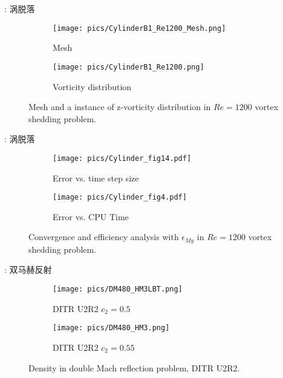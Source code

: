 \documentclass[aspectratio=169,serif]{beamer} %
\begin{document}
\begin{frame}{\secname: 涡脱落}
  \scriptsize
  \begin{figure}[htbp]
    \centering
    \begin{subfigure}{0.4\textwidth}
      \texttt{[image: pics/CylinderB1\_Re1200\_Mesh.png]}
      \caption[]{Mesh}
      \label{sfig:CylinderRe1200Demo_Mesh}
    \end{subfigure}
    \begin{subfigure}{0.4\textwidth}
      \texttt{[image: pics/CylinderB1\_Re1200.png]}
      \caption[]{Vorticity distribution}
      \label{sfig:CylinderRe1200Demo_Vort}
    \end{subfigure}
    \caption[]{Mesh and a instance of z-vorticity distribution
      in $Re=1200$ vortex shedding problem.}
    \label{fig:CylinderRe1200Demo}
  \end{figure}
\end{frame}



\begin{frame}{\secname: 涡脱落}
  \scriptsize
  \begin{figure}[htbp]
    \centering
    \begin{subfigure}{0.5\textwidth}
      \texttt{[image: pics/Cylinder\_fig14.pdf]}
      \caption[]{Error vs. time step size}
      \label{sfig:CylinderRe1200_My_C}
    \end{subfigure}\hfill
    \begin{subfigure}{0.5\textwidth}
      \texttt{[image: pics/Cylinder\_fig4.pdf]}
      \caption[]{Error vs. CPU Time}
      \label{sfig:CylinderRe1200_My_E}
    \end{subfigure}
    \caption[]{Convergence and efficiency analysis with $\epsilon_{My}$ in $Re=1200$ 
    vortex shedding problem.}
    \label{fig:CylinderRe1200_My}
  \end{figure}
\end{frame}

\begin{frame}{\secname: 双马赫反射}
  \scriptsize
  \begin{figure}[htbp]
    \centering
    \begin{subfigure}{0.5\textwidth}
      \texttt{[image: pics/DM480\_HM3LBT.png]}
      \caption[]{DITR U2R2 $c_2=0.5$}
      \label{sfig:DM480_HM3LBT}
    \end{subfigure}\hfill
    \begin{subfigure}{0.5\textwidth}
      \texttt{[image: pics/DM480\_HM3.png]}
      \caption[]{DITR U2R2 $c_2=0.55$}
      \label{sfig:DM480_HM3}
    \end{subfigure}
    \caption{Density in double Mach reflection problem, DITR U2R2.}
    \label{fig:DM480-1}
  \end{figure}
\end{frame}
\end{document}
